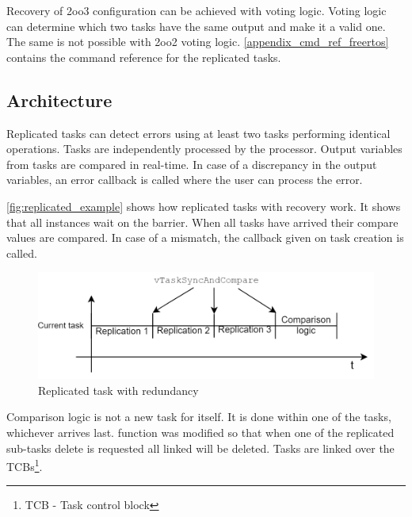 Recovery of 2oo3 configuration can be achieved with voting logic. Voting logic can determine which two tasks have the same output and make it a valid one. The same is not possible with 2oo2 voting logic. \autoref{appendix_cmd_ref_freertos} contains the command reference for the replicated tasks.

\subsection{Architecture}

Replicated tasks can detect errors using at least two tasks performing identical operations. Tasks are independently processed by the processor. Output variables from tasks are compared in real-time. In case of a discrepancy in the output variables, an error callback is called where the user can process the error.

\autoref{fig:replicated_example} shows how replicated tasks with recovery work. It shows that all instances wait on the barrier. When all tasks have arrived their compare values are compared. In case of a mismatch, the callback given on task creation is called. 


\begin{figure}[H]

      \centering
      \includegraphics[width=\linewidth]{images/replicated_example.png}
      \caption{Replicated task with redundancy}
      \label{fig:replicated_example}
    
\end{figure}

Comparison logic is not a new task for itself. It is done within one of the tasks, whichever arrives last.  function was modified so that when one of the replicated sub-tasks delete is requested all linked will be deleted. Tasks are linked over the TCBs\footnote{TCB - Task control block}.


